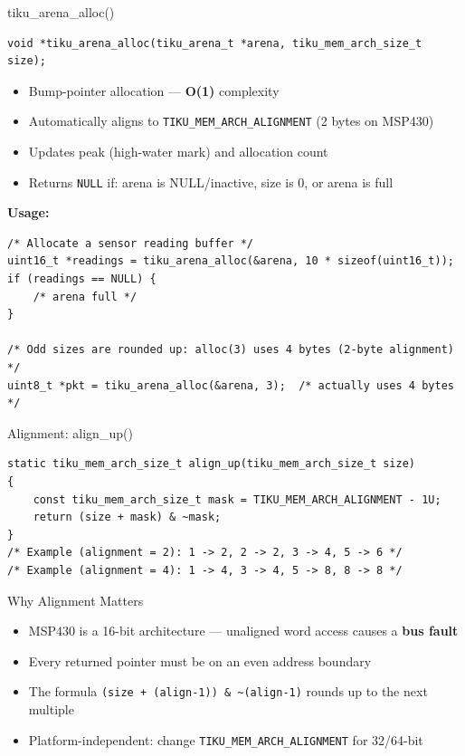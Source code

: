 \documentclass[aspectratio=169, 10pt]{beamer}
\begin{document}
\begin{frame}[fragile]{tiku\_arena\_alloc()}
\begin{lstlisting}[style=cstyle]
void *tiku_arena_alloc(tiku_arena_t *arena, tiku_mem_arch_size_t size);
\end{lstlisting}

\begin{itemize}
  \item Bump-pointer allocation --- \textbf{O(1)} complexity
  \item Automatically aligns to \texttt{TIKU\_MEM\_ARCH\_ALIGNMENT} (2 bytes on MSP430)
  \item Updates peak (high-water mark) and allocation count
  \item Returns \texttt{NULL} if: arena is NULL/inactive, size is 0, or arena is full
\end{itemize}

\vspace{0.3em}
\textbf{Usage:}
\begin{lstlisting}[style=cstyle]
/* Allocate a sensor reading buffer */
uint16_t *readings = tiku_arena_alloc(&arena, 10 * sizeof(uint16_t));
if (readings == NULL) {
    /* arena full */
}

/* Odd sizes are rounded up: alloc(3) uses 4 bytes (2-byte alignment) */
uint8_t *pkt = tiku_arena_alloc(&arena, 3);  /* actually uses 4 bytes */
\end{lstlisting}
\end{frame}

\begin{frame}[fragile]{Alignment: align\_up()}
\begin{lstlisting}[style=cstyle, title={kernel/memory/tiku\_mem.c (private helper)}]
static tiku_mem_arch_size_t align_up(tiku_mem_arch_size_t size)
{
    const tiku_mem_arch_size_t mask = TIKU_MEM_ARCH_ALIGNMENT - 1U;
    return (size + mask) & ~mask;
}
/* Example (alignment = 2): 1 -> 2, 2 -> 2, 3 -> 4, 5 -> 6 */
/* Example (alignment = 4): 1 -> 4, 3 -> 4, 5 -> 8, 8 -> 8 */
\end{lstlisting}

\vspace{0.3em}
\begin{block}{Why Alignment Matters}
\begin{itemize}
  \item MSP430 is a 16-bit architecture --- unaligned word access causes a \textbf{bus fault}
  \item Every returned pointer must be on an even address boundary
  \item The formula \texttt{(size + (align-1)) \& \textasciitilde(align-1)} rounds up to the next multiple
  \item Platform-independent: change \texttt{TIKU\_MEM\_ARCH\_ALIGNMENT} for 32/64-bit
\end{itemize}
\end{block}
\end{frame}
\end{document}
